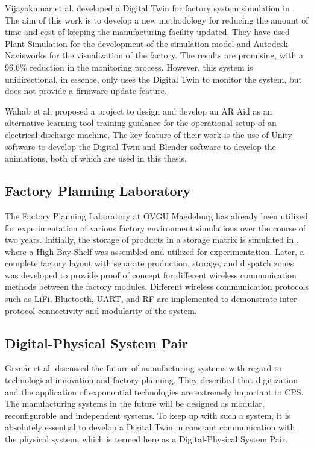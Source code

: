 Vijayakumar et al. developed a Digital Twin for factory system simulation in \cite{vijayakumar2019digital}. The aim of this work is to develop a new methodology for reducing the amount of time and cost of keeping the manufacturing facility updated. They have used Plant Simulation for the development of the simulation model and Autodesk Navisworks for the visualization of the factory. The results are promising, with a 96.6\% reduction in the monitoring process. However, this system is unidirectional, in essence, only uses the Digital Twin to monitor the system, but does not provide a firmware update feature.

Wahab et al. \cite{wahab2023} proposed a project to design and develop an AR Aid as an alternative learning tool training guidance for the operational setup of an electrical discharge machine. The key feature of their work is the use of Unity software to develop the Digital Twin and Blender software to develop the animations, both of which are used in this thesis,

\subsection{Factory Planning Laboratory}
The Factory Planning Laboratory at OVGU Magdeburg has already been utilized for experimentation of various factory environment simulations over the course of two years. Initially, the storage of products in a storage matrix is simulated in \cite{Sankaramanchi_I-4_0-learning-Laboratory-_2023}, where a High-Bay Shelf was assembled and utilized for experimentation. Later, a complete factory layout with separate production, storage, and dispatch zones was developed to provide proof of concept for different wireless communication methods between the factory modules. Different wireless communication protocols such as \acrshort{LiFi}, Bluetooth, UART, and RF are implemented to demonstrate inter-protocol connectivity and modularity of the system. \cite{Sankaramanchi_I-4_0-learning-Laboratory-_2023}

\subsection{Digital-Physical System Pair}
Grznár et al. \cite{grznar2020modeling} discussed the future of manufacturing systems with regard to technological innovation and factory planning. They described that digitization and the application of exponential technologies are extremely important to CPS. The manufacturing systems in the future will be designed as modular, reconfigurable and independent systems. To keep up with such a system, it is absolutely essential to develop a Digital Twin in constant communication with the physical system, which is termed here as a Digital-Physical System Pair.

